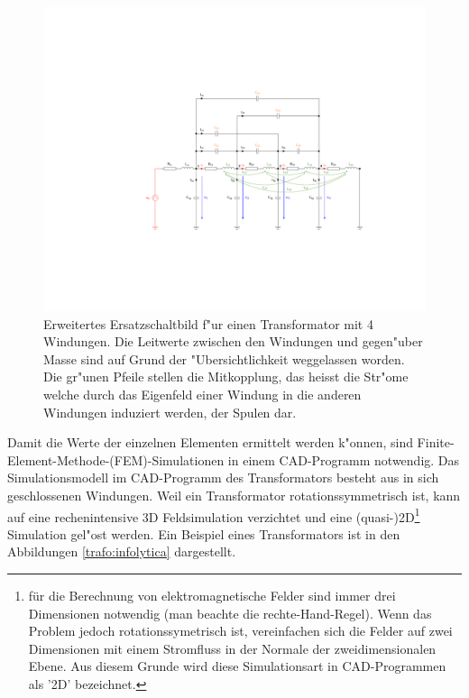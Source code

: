 \begin{refsection}
\begin{figure}
	\centering
	\includegraphics[width=\hsize]{./trafo/images/Trafo_Modell.pdf}
	\caption[Erweitertes Ersatzschaltbild f"ur einen Transformator]{Erweitertes Ersatzschaltbild f"ur einen Transformator mit 4 Windungen. Die Leitwerte zwischen den Windungen und gegen"uber Masse sind auf Grund der "Ubersichtlichkeit weggelassen worden. Die gr"unen Pfeile stellen die Mitkopplung, das heisst die Str"ome welche durch das Eigenfeld einer Windung in die anderen Windungen induziert werden, der Spulen dar. }
	\label{trafo:erweitertes_ESB}
\end{figure}

Damit die Werte der einzelnen Elementen ermittelt werden k"onnen, sind Finite-Element-Methode-(FEM)-Simulationen in einem CAD-Programm notwendig. Das Simulationsmodell im CAD-Programm des Transformators besteht aus in sich geschlossenen Windungen. Weil ein Transformator rotationssymmetrisch ist, kann auf eine rechenintensive 3D Feldsimulation verzichtet und eine (quasi-)2D\footnote{für die Berechnung von elektromagnetische Felder sind immer drei Dimensionen notwendig (man beachte die rechte-Hand-Regel). Wenn das Problem jedoch rotationssymetrisch ist, vereinfachen sich die Felder auf zwei Dimensionen mit einem Stromfluss in der Normale der zweidimensionalen Ebene. Aus diesem Grunde wird diese Simulationsart in CAD-Programmen als '2D' bezeichnet.} Simulation gel"ost werden. Ein Beispiel eines Transformators ist in den Abbildungen \ref{trafo:infolytica} dargestellt.


\end{refsection}
